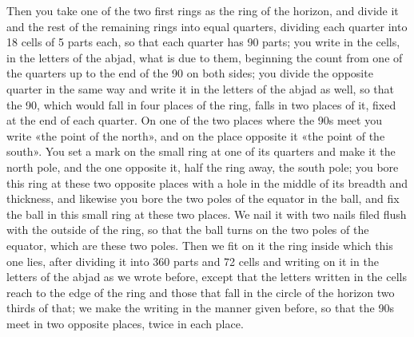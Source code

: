 \documentclass[11pt]{article}
\newcommand{\ArPage}[1]{\marginpar{\footnotesize\color{gray}Ar.\,p.\,#1}}
\begin{document}
\par \ArPage{212}Then you take one of the two first rings as the ring of the horizon, and divide it and the rest of the remaining rings into equal quarters, dividing each quarter into 18 cells of 5 parts each, so that each quarter has 90 parts; you write in the cells, in the letters of the abjad, what is due to them, beginning the count from one of the quarters up to the end of the 90 on both sides; you divide the opposite quarter in the same way and write it in the letters of the abjad as well, so that the 90, which would fall in four places of the ring, falls in two places of it, fixed at the end of each quarter. On one of the two places where the 90s meet you write «the point of the north», and on the place opposite it «the point of the south». You set a mark on the small ring at one of its quarters and make it the north pole, and the one opposite it, half the ring away, the south pole; you bore this ring at these two opposite places with a hole in the middle of its breadth and thickness, and likewise you bore the two poles of the equator in the ball, and fix the ball in this small ring at these two places. We nail it with two nails filed flush with the outside of the ring, so that the ball turns on the two poles of the equator, which are these two poles. Then we fit on it the ring inside which this one lies, after dividing it into 360 parts and 72 cells and writing on it in the letters of the abjad as we wrote before, except that the letters written in the cells reach to the edge of the ring and those that fall in the circle of the horizon two thirds of that; we make the writing in the manner given before, so that the 90s meet in two opposite places, twice in each place.\par
\end{document}
